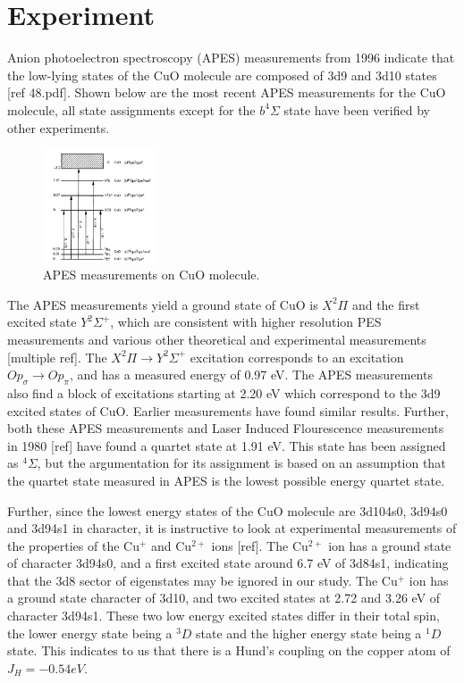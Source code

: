 \documentclass{article}
\begin{document}
\section{Experiment}
Anion photoelectron spectroscopy (APES) measurements from 1996 indicate that the low-lying states of the CuO molecule are composed of 3d9 and 3d10 states [ref 48.pdf]. Shown below are the most recent APES measurements for the CuO molecule, all state assignments except for the $b^4\Sigma$ state have been verified by other experiments.

\begin{figure}
  \begin{center}
    \includegraphics[width=0.3\textwidth]{APES.png}
  \end{center}
  \caption{APES measurements on CuO molecule.}
\end{figure}

The APES measurements yield a ground state of CuO is $X^2\Pi$ and the first excited state $Y^2\Sigma^+$, which are consistent with higher resolution PES measurements and various other theoretical and experimental measurements [multiple ref]. The $X^2\Pi \rightarrow Y^2\Sigma^+$ excitation corresponds to an excitation $O p_\sigma \rightarrow O p_\pi$, and has a measured energy of 0.97 eV. The APES measurements also find a block of excitations starting at 2.20 eV which correspond to the 3d9 excited states of CuO. Earlier measurements have found similar results. Further, both these APES measurements and Laser Induced Flourescence measurements in 1980 [ref] have found a quartet state at 1.91 eV. This state has been assigned as $^4\Sigma$, but the argumentation for its assignment is based on an assumption that the quartet state measured in APES is the lowest possible energy quartet state. 

Further, since the lowest energy states of the CuO molecule are 3d104s0, 3d94s0 and 3d94s1 in character, it is instructive to look at experimental measurements of the properties of the Cu$^+$ and Cu$^{2+}$ ions [ref]. The Cu$^{2+}$ ion has a ground state of character 3d94s0, and a first excited state around 6.7 eV of 3d84s1, indicating that the 3d8 sector of eigenstates may be ignored in our study. The Cu$^+$ ion has a ground state character of 3d10, and two excited states at 2.72 and 3.26 eV of character 3d94s1. These two low energy excited states differ in their total spin, the lower energy state being a $^3D$ state and the higher energy state being a $^1D$ state. This indicates to us that there is a Hund's coupling on the copper atom of $J_H = -0.54 eV$.
\end{document}
